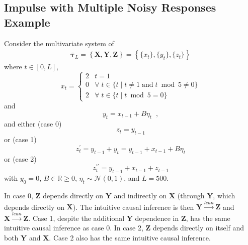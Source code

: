 \documentclass[twocolumn,aps,pre,groupedaddress]{revtex4-1}
\begin{document}
\subsection{Impulse with Multiple Noisy Responses Example}
Consider the multivariate system of
\begin{eqnarray}
\label{eqn:3var}
\bar{\mathbf{\tau}}_L = \left\{\mathbf{X},\mathbf{Y},\mathbf{Z}\right\} = \left\{\{x_t\},\{y_t\},\{z_t\}\right\}
\end{eqnarray}
where $t\in[0,L]$,
\begin{equation*}
x_t = \left\{
  \begin{array}{lr}
    2 & t = 1\\
    0 & \forall\; t\in\{t\;|\;t\neq 1 \;\mathrm{and}\; t\bmod 5 \neq 0\}\\
    2 & \forall\; t\in\{t\;|\;t\bmod 5 = 0\}
  \end{array}
\right.
\end{equation*}
and
\begin{equation*}
y_t = x_{t-1} + B\eta_t\;\;,
\end{equation*}
and either (case 0)
\begin{equation}
z_t = y_{t-1}
\end{equation}
or (case 1)
\begin{equation}
z_t^\prime = y_{t-1} + y_t = y_{t-1} + x_{t-1} + B\eta_t
\end{equation}
or (case 2)
\begin{equation}
z_t^{\prime\prime} = y_{t-1} + x_{t-1} + z_{t-1}
\end{equation}
with $y_0 = 0$, $B\in\mathbb{R}\ge 0$, $\eta_t\sim\mathcal{N}\left(0,1\right)$, and $L=500$.

In case 0, $\mathbf{Z}$ depends directly on $\mathbf{Y}$ and indirectly on $\mathbf{X}$ (through $\mathbf{Y}$, which depends directly on $\mathbf{X}$).  The intuitive causal inference is then $\mathbf{Y}\xrightarrow{lean}\mathbf{Z}$ and $\mathbf{X}\xrightarrow{lean}\mathbf{Z}$.  Case 1, despite the additional $\mathbf{Y}$ dependence in $\mathbf{Z}$, has the same intuitive causal inference as case 0.  In case 2, $\mathbf{Z}$ depends directly on itself and both $\mathbf{Y}$ and $\mathbf{X}$.  Case 2 also has the same intuitive causal inference.
\end{document}
